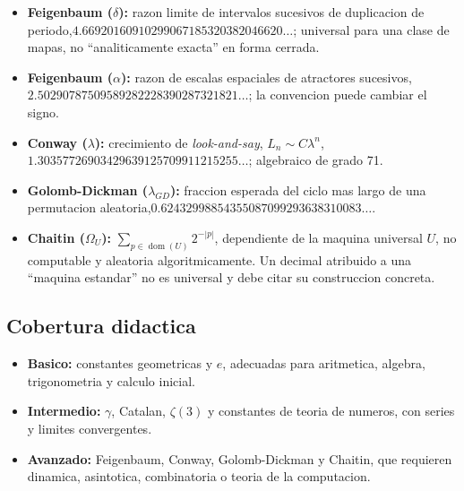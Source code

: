 \documentclass[11pt,a4paper]{article}
\begin{document}
\begin{itemize}
  \item \textbf{Feigenbaum ($\delta$):} razon limite de intervalos sucesivos de duplicacion de periodo,\newline $4.66920160910299067185320382046620\ldots$; universal para una clase de mapas, no ``analiticamente exacta'' en forma cerrada.
  \item \textbf{Feigenbaum ($\alpha$):} razon de escalas espaciales de atractores sucesivos,\newline $2.50290787509589282228390287321821\ldots$; la convencion puede cambiar el signo.
  \item \textbf{Conway ($\lambda$):} crecimiento de \textit{look-and-say}, $L_n\sim C\lambda^n$,\newline $1.30357726903429639125709911215255\ldots$; algebraico de grado 71.
  \item \textbf{Golomb-Dickman ($\lambda_{GD}$):} fraccion esperada del ciclo mas largo de una permutacion aleatoria,\newline $0.62432998854355087099293638310083\ldots$.
  \item \textbf{Chaitin ($\Omega_U$):} $\sum_{p\in\operatorname{dom}(U)}2^{-|p|}$, dependiente de la maquina universal $U$, no computable y aleatoria algoritmicamente. Un decimal atribuido a una ``maquina estandar'' no es universal y debe citar su construccion concreta.
\end{itemize}

\subsection*{Cobertura didactica}

\begin{itemize}
  \item \textbf{Basico:} constantes geometricas y $e$, adecuadas para aritmetica, algebra, trigonometria y calculo inicial.
  \item \textbf{Intermedio:} $\gamma$, Catalan, $\zeta(3)$ y constantes de teoria de numeros, con series y limites convergentes.
  \item \textbf{Avanzado:} Feigenbaum, Conway, Golomb-Dickman y Chaitin, que requieren dinamica, asintotica, combinatoria o teoria de la computacion.
\end{itemize}
\end{document}
